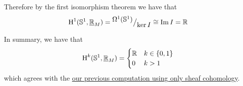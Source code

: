 \documentclass[../../main]{subfiles}
\begin{document}
\begin{example}
  Therefore by the first isomorphism theorem we have that
  \begin{equation*}
    \operatorname{H}^{1}(\mathbb{S}^{1}, \underline{\mathbb{R}}_{M}) = {^{\textstyle \Omega^{1}(\mathbb{S}^{1})}\big/_{\textstyle \ker I}} \cong \operatorname*{Im} I = \mathbb{R}
  \end{equation*}

  In summary, we have that
  \begin{align*}
    \operatorname{H}^{k}(\mathbb{S}^{1}, \underline{\mathbb{R}}_{M}) = \begin{cases}
      \mathbb{R} & k \in \{0, 1\} \\
      0 & k > 1
    \end{cases}
  \end{align*}
  which agrees with the \hyperref[ex:cohomology-S1]{our previous computation using only sheaf cohomology}.
\end{example}
\end{document}
